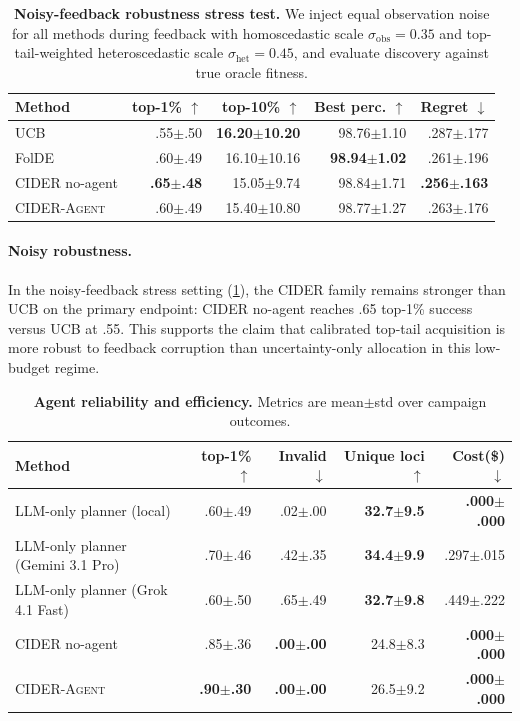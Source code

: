 \documentclass{article}
\newcommand{\method}{\textsc{CIDER}}
\newcommand{\agent}{\textsc{CIDER-Agent}}
\newcommand{\topone}{top-1\%}
\newcommand{\topten}{top-10\%}
\begin{document}
\begin{table}[t]
\caption{\textbf{Noisy-feedback robustness stress test.} We inject equal observation noise for all methods during feedback with homoscedastic scale $\sigma_{\mathrm{obs}}=0.35$ and top-tail-weighted heteroscedastic scale $\sigma_{\mathrm{het}}=0.45$, and evaluate discovery against true oracle fitness.}
\label{tab:noisy}
\centering
\scriptsize
\setlength{\tabcolsep}{3pt}
\begin{tabular}{lrrrr}
\toprule
Method & \topone{} $\uparrow$ & \topten{} $\uparrow$ & Best perc. $\uparrow$ & Regret $\downarrow$ \\
\midrule
UCB & .55$\pm$.50 & \textbf{16.20$\pm$10.20} & 98.76$\pm$1.10 & .287$\pm$.177 \\
FolDE & .60$\pm$.49 & \cellcolor{gray!20}16.10$\pm$10.16 & \textbf{98.94$\pm$1.02} & .261$\pm$.196 \\
\method{} no-agent & \textbf{.65$\pm$.48} & 15.05$\pm$9.74 & \cellcolor{gray!20}98.84$\pm$1.71 & \textbf{.256$\pm$.163} \\
\agent{} & \cellcolor{gray!20}.60$\pm$.49 & 15.40$\pm$10.80 & 98.77$\pm$1.27 & \cellcolor{gray!20}.263$\pm$.176 \\
\bottomrule
\end{tabular}
\end{table}

\paragraph{Noisy robustness.} In the noisy-feedback stress setting (\cref{tab:noisy}), the \method{} family remains stronger than UCB on the primary endpoint: \method{} no-agent reaches .65 \topone{} success versus UCB at .55. This supports the claim that calibrated top-tail acquisition is more robust to feedback corruption than uncertainty-only allocation in this low-budget regime.

\begin{table}[t]
\caption{\textbf{Agent reliability and efficiency.} Metrics are mean$\pm$std over campaign outcomes.}
\label{tab:agent}
\centering
\scriptsize
\setlength{\tabcolsep}{3pt}
\begin{tabular}{lrrrr}
\toprule
Method & \topone{} $\uparrow$ & Invalid $\downarrow$ & Unique loci $\uparrow$ & Cost(\$) $\downarrow$ \\
\midrule
LLM-only planner (local) & .60$\pm$.49 & \cellcolor{gray!20}.02$\pm$.00 & \textbf{32.7$\pm$9.5} & \textbf{.000$\pm$.000} \\
LLM-only planner (Gemini 3.1 Pro) & .70$\pm$.46 & .42$\pm$.35 & \textbf{34.4$\pm$9.9} & \cellcolor{gray!20}.297$\pm$.015 \\
LLM-only planner (Grok 4.1 Fast) & .60$\pm$.50 & .65$\pm$.49 & \textbf{32.7$\pm$9.8} & \cellcolor{gray!20}.449$\pm$.222 \\
\method{} no-agent & \cellcolor{gray!20}.85$\pm$.36 & \textbf{.00$\pm$.00} & 24.8$\pm$8.3 & \textbf{.000$\pm$.000} \\
\agent{} & \textbf{.90$\pm$.30} & \textbf{.00$\pm$.00} & \cellcolor{gray!20}26.5$\pm$9.2 & \textbf{.000$\pm$.000} \\
\bottomrule
\end{tabular}
\end{table}
\end{document}
